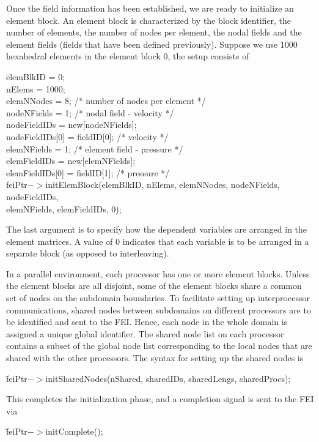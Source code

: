 Once the field information has been established, we are ready to initialize
an element block. An element block is characterized by the block identifier,
the number of elements, the number of nodes per element, the nodal fields 
and the element fields (fields that have been defined previously). Suppose 
we use $1000$ hexahedral elements in the element block $0$, the setup 
consists of
\begin{tabbing}
\hspace{0.5in} \= {\sf elemBlkID = 0;} \\
               \> {\sf nElems = 1000;} \\
               \> {\sf elemNNodes = 8; /* number of nodes per element */} \\
               \> {\sf nodeNFields = 1; /* nodal field - velocity */} \\
               \> {\sf nodeFieldIDs = new[nodeNFields];} \\
               \> {\sf nodeFieldIDs[0] = fieldID[0]; /* velocity */ } \\
               \> {\sf elemNFields = 1; /* element field - pressure */} \\
               \> {\sf elemFieldIDs = new[elemNFields];} \\
               \> {\sf elemFieldIDs[0] = fieldID[1]; /* pressure */ } \\
 \> {\sf feiPtr$->$initElemBlock(elemBlkID, nElems, elemNNodes, nodeNFields, nodeFieldIDs,}\\
 \> \hspace{1.0in} {\sf elemNFields, elemFieldIDs, 0);} 
\end{tabbing}
The last argument is to specify how the dependent variables are arranged in
the element matrices. A value of $0$ indicates that each variable is to be
arranged in a separate block (as opposed to interleaving).

In a parallel environment, each processor has one or more element blocks.
Unless the element blocks are all disjoint, some of the element blocks
share a common set of nodes on the subdomain boundaries. To facilitate
setting up interprocessor communications, shared nodes between subdomains
on different processors are to be identified and sent to the {\sf FEI}.
Hence, each node in the whole domain is assigned a unique global
identifier. The shared node list on each processor contains a subset
of the global node list
corresponding to the local nodes that are shared with the other processors.
The syntax for setting up the shared nodes is
\begin{tabbing}
\hspace{0.5in} \= {\sf feiPtr$->$initSharedNodes(nShared, sharedIDs, sharedLengs, sharedProcs);}
\end{tabbing}
This completes the initialization phase, and a completion signal is sent to
the {\sf FEI} via
\begin{tabbing}
\hspace{0.5in} \= {\sf feiPtr$->$initComplete();}
\end{tabbing}

